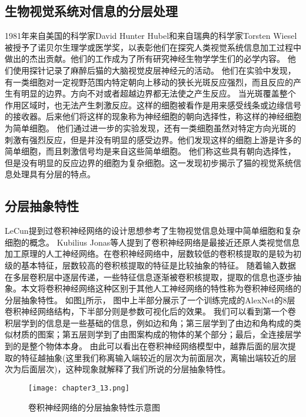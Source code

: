 \subsection{生物视觉系统对信息的分层处理}
1981年来自美国的科学家David Hunter Hubel和来自瑞典的科学家Torsten Wiesel被授予了诺贝尔生理学或医学奖，以表彰他们在探究人类视觉系统信息加工过程中做出的杰出贡献\cite{Hubel1998EarlyEO}。他们的工作成为了所有研究神经生物学学生们的必学内容。
他们使用探针记录了麻醉后猫的大脑视觉皮层神经元的活动\cite{https://doi.org/10.1113/jphysiol.1959.sp006308}。
他们在实验中发现，有一类细胞对一定视野范围内特定朝向上移动的狭长光斑反应强烈，而且反应的产生有明显的边界。方向不对或者超越边界都无法使之产生反应。
当光斑覆盖整个作用区域时，也无法产生刺激反应。这样的细胞被看作是用来感受线条或边缘信号的接收器。后来他们将这样的现象称为神经细胞的朝向选择性，称这样的神经细胞为简单细胞。
他们通过进一步的实验发现，还有一类细胞虽然对特定方向光斑的刺激有强烈反应，但是并没有明显的感受边界。他们发现这样的细胞上游是许多的简单细胞，而且刺激信号均是来自这些简单细胞。
他们称这些具有朝向选择性，但是没有明显的反应边界的细胞为复杂细胞。这一发现初步揭示了猫的视觉系统信息处理具有分层的特点。

\subsection{分层抽象特性}
LeCun\cite{726791}提到过卷积神经网络的设计思想参考了生物视觉信息处理中简单细胞和复杂细胞\cite{hubel1962}的概念。
Kubilius Jonas等人\cite{2019arXiv190906161K}提到了卷积神经网络是最接近还原人类视觉信息加工原理的人工神经网络。在卷积神经网络中，层数较低的卷积核提取的是较为初级的基本特征，层数较高的卷积核提取的特征是比较抽象的特征。
随着输入数据在多层卷积层中逐层传递，一些特征信息逐渐被卷积核提取，提取的信息也逐步抽象。本文将卷积神经网络这种区别于其他人工神经网络的特性称为卷积神经网络的分层抽象特性。
如图\ref{fig:chapter3_13}所示， 图中上半部分展示了一个训练完成的AlexNet\cite{alexnet2017}的8层卷积神经网络结构，下半部分则是参数可视化\cite{Zeiler2014,Mahendran_2015_CVPR}后的效果。
我们可以看到第一个卷积层学到的信息是一些基础的信息，例如边和角；第三层学到了由边和角构成的类似材质的图案；第五层则学到了由图案构成的物体的某个部分；最后，全连接层学到的是整个物体本身。
由此可以看出在卷积神经网络模型中，越靠后面的层次提取的特征越抽象(这里我们称离输入端较近的层次为前面层次，离输出端较近的层次为后面层次)，这种现象就解释了我们所说的分层抽象特性。
\begin{figure}
    \centering
    \texttt{[image: chapter3\_13.png]}
    \caption{卷积神经网络的分层抽象特性示意图}
    \label{fig:chapter3_13}
\end{figure}


